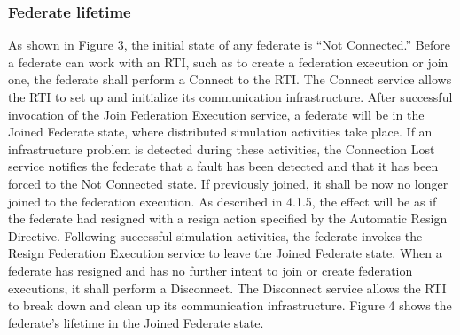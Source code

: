 \subsubsection{Federate lifetime}

As shown in Figure 3, the initial state of any federate is ``Not Connected.'' Before a federate can work with an RTI, such as to create a federation execution or join one, the federate shall perform a Connect to the RTI. The Connect service allows the RTI to set up and initialize its communication infrastructure. After successful invocation of the Join Federation Execution service, a federate will be in the Joined Federate state, where distributed simulation activities take place. If an infrastructure problem is detected during these activities, the Connection Lost \rtiinitiated{} service notifies the federate that a fault has been detected and that it has been forced to the Not Connected state. If previously joined, it shall be now no longer joined to the federation execution. As described in 4.1.5, the effect will be as if the federate had resigned with a resign action specified by the Automatic Resign Directive. Following successful simulation activities, the federate invokes the Resign Federation Execution service to leave the Joined Federate state. When a federate has resigned and has no further intent to join or create federation executions, it shall perform a Disconnect. The Disconnect service allows the RTI to break down and clean up its communication infrastructure. Figure 4 shows the federate's lifetime in the Joined Federate state.

